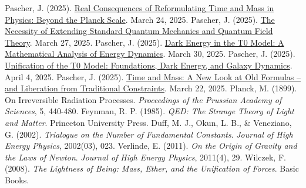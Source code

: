 \documentclass[12pt,a4paper]{article}
\begin{document}
\begin{thebibliography}{99}
		 Pascher, J. (2025). \href{https://github.com/jpascher/T0-Time-Mass-Duality/tree/main/2/pdf/English/JenseitsPlanckEn.pdf}{Real Consequences of Reformulating Time and Mass in Physics: Beyond the Planck Scale}. March 24, 2025.
		 Pascher, J. (2025). \href{https://github.com/jpascher/T0-Time-Mass-Duality/tree/main/2/pdf/English/NotwendigkeitQMErweiterungEn.pdf}{The Necessity of Extending Standard Quantum Mechanics and Quantum Field Theory}. March 27, 2025.
		 Pascher, J. (2025). \href{https://github.com/jpascher/T0-Time-Mass-Duality/tree/main/2/pdf/English/MathEnergiedynamikEn.pdf}{Dark Energy in the T0 Model: A Mathematical Analysis of Energy Dynamics}. March 30, 2025.
		 Pascher, J. (2025). \href{https://github.com/jpascher/T0-Time-Mass-Duality/tree/main/2/pdf/English/T0VereinheitlichungDEGalEn.pdf}{Unification of the T0 Model: Foundations, Dark Energy, and Galaxy Dynamics}. April 4, 2025.
		 Pascher, J. (2025). \href{https://github.com/jpascher/T0-Time-Mass-Duality/tree/main/2/pdf/English/ZeitMasseNeuerBlickEn.pdf}{Time and Mass: A New Look at Old Formulas – and Liberation from Traditional Constraints}. March 22, 2025.
		 Planck, M. (1899). On Irreversible Radiation Processes. \textit{Proceedings of the Prussian Academy of Sciences}, 5, 440-480.
		 Feynman, R. P. (1985). \textit{QED: The Strange Theory of Light and Matter}. Princeton University Press.
		 Duff, M. J., Okun, L. B., \& Veneziano, G. (2002). \textit{Trialogue on the Number of Fundamental Constants}. \textit{Journal of High Energy Physics}, 2002(03), 023.
		 Verlinde, E. (2011). \textit{On the Origin of Gravity and the Laws of Newton}. \textit{Journal of High Energy Physics}, 2011(4), 29.
		 Wilczek, F. (2008). \textit{The Lightness of Being: Mass, Ether, and the Unification of Forces}. Basic Books.
	\end{thebibliography}
	
\end{document}
